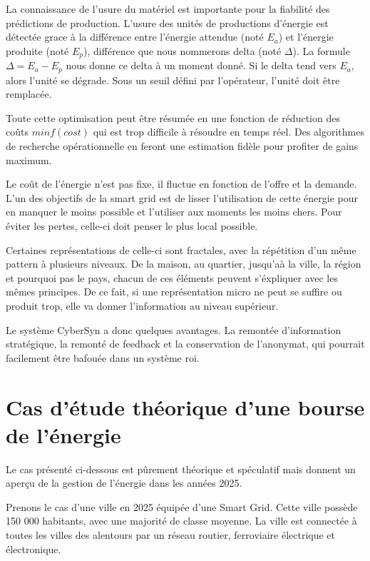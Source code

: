 La connaissance de l'usure du matériel est importante pour la fiabilité des prédictions de production.
L'usure des unités de productions d'énergie est détectée grace à la différence entre l'énergie attendue
(noté $E_a$) et l'énergie produite (noté $E_p$), différence que nous nommerons delta (noté $\Delta$).
La formule $\Delta = E_a - E_p$ nous donne ce delta à un moment donné.
Si le delta tend vers $E_a$, alors l'unité se dégrade. Sous un seuil défini par l'opérateur,
l'unité doit être remplacée.

Toute cette optimisation peut être résumée en une fonction de réduction des coûts $min f(cost)$ qui est trop difficile
à résoudre en temps réel. Des algorithmes de recherche opérationnelle en feront une estimation fidèle
pour profiter de gains maximum.


Le coût de l'énergie n'est pas fixe, il fluctue en fonction de l'offre et la demande.
L'un des objectifs de la smart grid est de lisser l'utilisation de cette énergie pour
en manquer le moins possible et l'utiliser aux moments les moins chers. Pour éviter les pertes,
celle-ci doit penser le plus local possible.

Certaines représentations de celle-ci sont fractales, avec la répétition d'un même pattern à
plusieurs niveaux.
De la maison, au quartier, jusqu'aà la ville, la région et pourquoi pas le pays, chacun de
ces éléments peuvent s'éxpliquer avec les mêmes principes.
De ce fait, si une représentation micro ne peut se suffire ou produit trop, elle va donner l'information
au niveau supérieur.

Le système CyberSyn a donc quelques avantages.
La remontée d'information stratégique, la remonté de feedback et la conservation de l'anonymat,
qui pourrait facilement être bafouée dans un système roi.

\section{Cas d'étude théorique d'une bourse de l'énergie}

Le cas présenté ci-dessous est pûrement théorique et spéculatif mais donnent un aperçu de
la gestion de l'énergie dans les années 2025.

Prenons le cas d'une ville en 2025 équipée d'une Smart Grid.
Cette ville possède 150 000 habitants, avec une majorité de classe moyenne.
La ville est connectée à toutes les villes des alentours par un réseau routier, ferroviaire
électrique et électronique.

